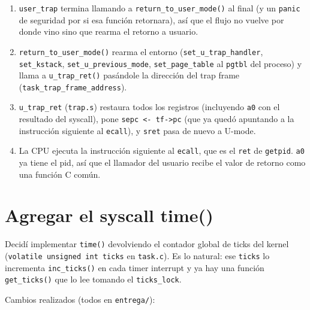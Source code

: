 \documentclass[11pt,a4paper]{article}
\begin{document}
\begin{enumerate}[leftmargin=1.6em]
\begin{itemize}[leftmargin=1.2em]
        \item Dispatcher: \texttt{syscalls\_table[1] = sys\_getpid}.
        \item \texttt{sys\_getpid(task)} retorna \texttt{task->pid} (el pid del
        proceso).
        \item \texttt{syscall\_put\_result(tf, result)} deja el valor en
        \texttt{tf->a0}.
    \end{itemize}
    \item \texttt{user\_trap} termina llamando a
    \texttt{return\_to\_user\_mode()} al final (y un \texttt{panic} de
    seguridad por si esa función retornara), así que el flujo no vuelve por
    donde vino sino que rearma el retorno a usuario.
    \item \texttt{return\_to\_user\_mode()} rearma el entorno
    (\texttt{set\_u\_trap\_handler}, \texttt{set\_kstack},
    \texttt{set\_u\_previous\_mode}, \texttt{set\_page\_table} al \texttt{pgtbl}
    del proceso) y llama a \texttt{u\_trap\_ret()} pasándole la dirección del
    trap frame (\texttt{task\_trap\_\allowbreak frame\_\allowbreak address}).
    \item \texttt{u\_trap\_ret} (\texttt{trap.s}) restaura todos los registros
    (incluyendo \texttt{a0} con el resultado del syscall), pone
    \texttt{sepc <- tf->pc} (que ya quedó apuntando a la instrucción siguiente al
    \texttt{ecall}), y \texttt{sret} pasa de nuevo a U-mode.
    \item La CPU ejecuta la instrucción siguiente al \texttt{ecall}, que es el
    \texttt{ret} de \texttt{getpid}. \texttt{a0} ya tiene el pid, así que el
    llamador del usuario recibe el valor de retorno como una función C común.
\end{enumerate}

\section{Agregar el syscall time()}

Decidí implementar \texttt{time()} devolviendo el contador global de ticks del
kernel (\texttt{volatile unsigned int ticks} en \texttt{task.c}). Es lo natural:
ese \texttt{ticks} lo incrementa \texttt{inc\_ticks()} en cada timer interrupt y
ya hay una función \texttt{get\_ticks()} que lo lee tomando el
\texttt{ticks\_lock}.

Cambios realizados (todos en \texttt{entrega/}):
\end{document}
